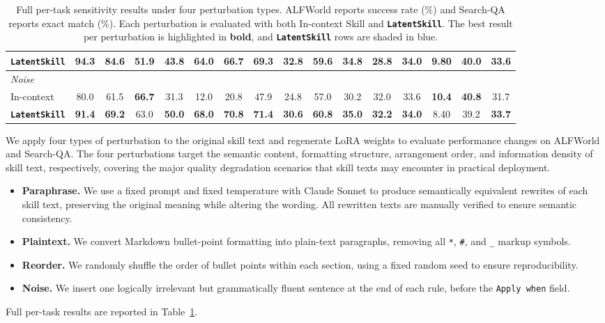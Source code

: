 \documentclass{llmxive}
\providecommand{\best}[1]{\textbf{#1}}
\providecommand{\textttt}[1]{\texttt{#1}}
\providecommand{\method}{\textbf{\textttt{LatentSkill}}}
\begin{document}
\begin{table}[!t]
\begin{tabular}{
  l
  cccccc c
  ccccccc c
}
\rowcolor{ourblue}
\method{} & \best{94.3} & \best{84.6} & 51.9 & \best{43.8} & \best{64.0} & \best{66.7} & \best{69.3}
  & \best{32.8} & \best{59.6} & \best{34.8} & 28.8 & 34.0 & 9.80 & \best{40.0} & \best{33.6} \\
\midrule
\multicolumn{16}{l}{\emph{Noise}} \\
In-context & 80.0 & 61.5 & \best{66.7} & 31.3 & 12.0 & 20.8 & 47.9
  & 24.8 & 57.0 & 30.2 & 32.0 & 33.6 & \best{10.4} & \best{40.8} & 31.7 \\
\rowcolor{ourblue}
\method{} & \best{91.4} & \best{69.2} & 63.0 & \best{50.0} & \best{68.0} & \best{70.8} & \best{71.4}
  & \best{30.6} & \best{60.8} & \best{35.0} & \best{32.2} & \best{34.0} & 8.40 & 39.2 & \best{33.7} \\
\bottomrule
\end{tabular}
\caption{
  Full per-task sensitivity results under four perturbation types.
  ALFWorld reports success rate (\%) and Search-QA reports exact match (\%).
  Each perturbation is evaluated with both In-context Skill and \method{}.
  The best result per perturbation is highlighted in \textbf{bold}, and \method{} rows are shaded in blue.
}
\label{tab:sensitivity_full_table}
\end{table}
We apply four types of perturbation to the original skill text and regenerate LoRA weights to evaluate performance changes on ALFWorld and Search-QA. The four perturbations target the semantic content, formatting structure, arrangement order, and information density of skill text, respectively, covering the major quality degradation scenarios that skill texts may encounter in practical deployment.

\begin{itemize}
    \item \textbf{Paraphrase.} We use a fixed prompt and fixed temperature with Claude Sonnet to produce semantically equivalent rewrites of each skill text, preserving the original meaning while altering the wording. All rewritten texts are manually verified to ensure semantic consistency.
    \item \textbf{Plaintext.} We convert Markdown bullet-point formatting into plain-text paragraphs, removing all \texttt{*}, \texttt{\#}, and \texttt{\_} markup symbols.
    \item \textbf{Reorder.} We randomly shuffle the order of bullet points within each section, using a fixed random seed to ensure reproducibility.
    \item \textbf{Noise.} We insert one logically irrelevant but grammatically fluent sentence at the end of each rule, before the \texttt{Apply when} field.
\end{itemize}

Full per-task results are reported in Table~\ref{tab:sensitivity_full_table}.
\end{document}
